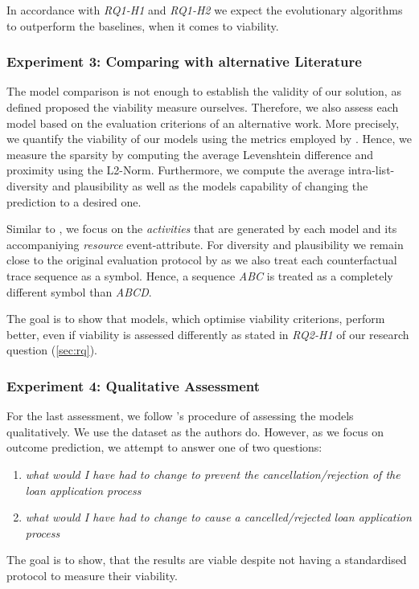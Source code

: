 \documentclass[./../../paper.tex]{subfiles}
\begin{document}
\noindent In accordance with \emph{RQ1-H1} and \emph{RQ1-H2} we expect the evolutionary algorithms to outperform the baselines, when it comes to viability.

\subsubsection{Experiment 3: Comparing with alternative Literature}
The model comparison is not enough to establish the validity of our solution, as defined proposed the viability measure ourselves. Therefore, we also assess each model based on the evaluation criterions of an alternative work. More precisely, we quantify the viability of our models using the metrics employed by \citeauthor{hsieh_DiCE4ELInterpretingProcess_2021}. Hence, we measure the sparsity by computing the average Levenshtein difference and proximity using the L2-Norm. Furthermore, we compute the average intra-list-diversity and plausibility as well as the models capability of changing the prediction to a desired one. 

Similar to \citeauthor{hsieh_DiCE4ELInterpretingProcess_2021}, we focus on the \emph{activities} that are generated by each model and its accompaniying \emph{resource} event-attribute. For diversity and plausibility we remain close to the original evaluation protocol by \citeauthor{hsieh_DiCE4ELInterpretingProcess_2021} as we also treat each counterfactual trace sequence as a symbol. Hence, a sequence \emph{ABC} is treated as a completely different symbol than \emph{ABCD}.

The goal is to show that models, which optimise viability criterions, perform better, even if viability is assessed differently as stated in \emph{RQ2-H1} of our research question (\autoref{sec:rq}). 

\subsubsection{Experiment 4: Qualitative Assessment}
For the last assessment, we follow \citeauthor{hsieh_DiCE4ELInterpretingProcess_2021}'s procedure of assessing the models qualitatively. We use the dataset as the authors do. However, as we focus on outcome prediction, we attempt to answer one of two questions: 

\begin{enumerate}
    \item \emph{what would I have had to change to prevent the cancellation/rejection of the loan application process}
    \item \emph{what would I have had to change to cause a cancelled/rejected loan application process}
\end{enumerate}

The goal is to show, that the results are viable despite not having a standardised protocol to measure their viability.
\end{document}
